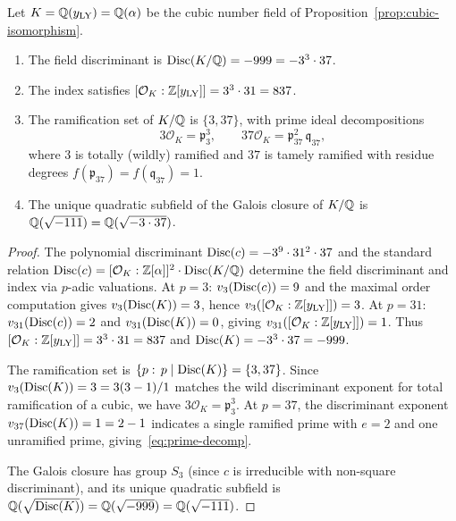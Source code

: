 \begin{proposition}\label{prop:cubic-disc}
Let $K=\mathbb{Q}(y_{\mathrm{LY}})=\mathbb{Q}(\alpha)$ be the cubic number field of Proposition~\ref{prop:cubic-isomorphism}.
\begin{enumerate}
\item[(i)] The field discriminant is $\operatorname{Disc}(K/\mathbb{Q})=-999=-3^3\cdot 37$.
\item[(ii)] The index satisfies $[\mathcal{O}_K:\mathbb{Z}[y_{\mathrm{LY}}]]=3^3\cdot 31=837$.
\item[(iii)] The ramification set of $K/\mathbb{Q}$ is $\{3,37\}$, with prime ideal decompositions
\begin{equation}\label{eq:prime-decomp}
3\mathcal{O}_K=\mathfrak{p}_3^3,\qquad 37\mathcal{O}_K=\mathfrak{p}_{37}^2\,\mathfrak{q}_{37},
\end{equation}
where $3$ is totally (wildly) ramified and $37$ is tamely ramified with residue degrees $f(\mathfrak{p}_{37})=f(\mathfrak{q}_{37})=1$.
\item[(iv)] The unique quadratic subfield of the Galois closure of $K/\mathbb{Q}$ is $\mathbb{Q}(\sqrt{-111})=\mathbb{Q}(\sqrt{-3\cdot 37})$.
\end{enumerate}
\end{proposition}

\begin{proof}
The polynomial discriminant $\operatorname{Disc}(c)=-3^9\cdot 31^2\cdot 37$ and the standard relation $\operatorname{Disc}(c)=[\mathcal{O}_K:\mathbb{Z}[\alpha]]^2\cdot\operatorname{Disc}(K/\mathbb{Q})$ determine the field discriminant and index via $p$-adic valuations.
At $p=3$: $v_3(\operatorname{Disc}(c))=9$ and the maximal order computation gives $v_3(\operatorname{Disc}(K))=3$, hence $v_3([\mathcal{O}_K:\mathbb{Z}[y_{\mathrm{LY}}]])=3$.
At $p=31$: $v_{31}(\operatorname{Disc}(c))=2$ and $v_{31}(\operatorname{Disc}(K))=0$, giving $v_{31}([\mathcal{O}_K:\mathbb{Z}[y_{\mathrm{LY}}]])=1$.
Thus $[\mathcal{O}_K:\mathbb{Z}[y_{\mathrm{LY}}]]=3^3\cdot 31=837$ and $\operatorname{Disc}(K)=-3^3\cdot 37=-999$.

The ramification set is $\{p:\,p\mid\operatorname{Disc}(K)\}=\{3,37\}$.
Since $v_3(\operatorname{Disc}(K))=3=3(3-1)/1$ matches the wild discriminant exponent for total ramification of a cubic, we have $3\mathcal{O}_K=\mathfrak{p}_3^3$.
At $p=37$, the discriminant exponent $v_{37}(\operatorname{Disc}(K))=1=2-1$ indicates a single ramified prime with $e=2$ and one unramified prime, giving~\eqref{eq:prime-decomp}.

The Galois closure has group $S_3$ (since $c$ is irreducible with non-square discriminant), and its unique quadratic subfield is $\mathbb{Q}(\sqrt{\operatorname{Disc}(K)})=\mathbb{Q}(\sqrt{-999})=\mathbb{Q}(\sqrt{-111})$.
\end{proof}

